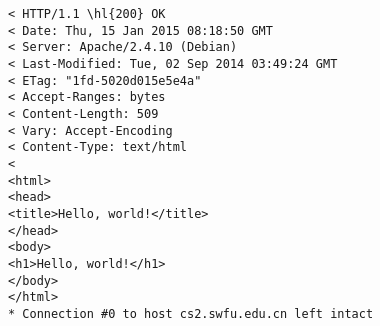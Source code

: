 \documentclass[varwidth=27em,crop]{standalone}
\begin{document}
\begin{Verbatim}[commandchars=\\\{\}]
< HTTP/1.1 \hl{200} OK
< Date: Thu, 15 Jan 2015 08:18:50 GMT
< Server: Apache/2.4.10 (Debian)
< Last-Modified: Tue, 02 Sep 2014 03:49:24 GMT
< ETag: "1fd-5020d015e5e4a"
< Accept-Ranges: bytes
< Content-Length: 509
< Vary: Accept-Encoding
< Content-Type: text/html
< 
<html>
<head>
<title>Hello, world!</title>
</head>
<body>
<h1>Hello, world!</h1>
</body>
</html>
* Connection #0 to host cs2.swfu.edu.cn left intact
\end{Verbatim}
\end{document}

